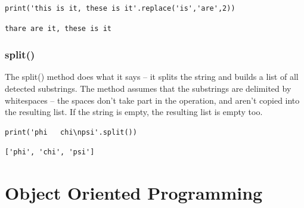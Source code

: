 \documentclass[11pt]{article}
\begin{document}
\begin{verbatim}
print('this is it, these is it'.replace('is','are',2))
\end{verbatim}

\begin{verbatim}
thare are it, these is it
\end{verbatim}

\subsubsection{split()}
\label{sec:org08e8d6c}
The split() method does what it says – it splits the string and
builds a list of all detected substrings. The method assumes that
the substrings are delimited by whitespaces – the spaces don’t take
part in the operation, and aren’t copied into the resulting list. If
the string is empty, the resulting list is empty too.

\begin{verbatim}
print('phi   chi\npsi'.split())
\end{verbatim}

\begin{verbatim}
['phi', 'chi', 'psi']
\end{verbatim}

\newpage

\section{Object Oriented Programming}
\label{sec:org224e2a9}
\end{document}
